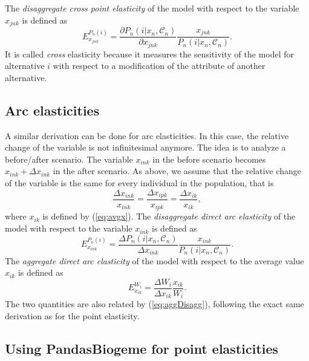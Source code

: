 \documentclass[12pt,a4paper]{article}
\newcommand{\req}[1]{(\ref{#1})}
\newcommand{\C}{\mathcal{C}}
\begin{document}
The \emph{disaggregate cross point elasticity} of the model with respect to
the variable $x_{jnk}$ is defined as
\begin{equation}
\label{eq:disagCrossElasticity}
  E_{x_{jnk}}^{P_n(i)} = \frac{\partial P_n(i|x_n, \C_n)}{\partial
  x_{jnk}} \frac{x_{jnk}}{P_n(i|x_n, \C_n)}.
\end{equation}
It is called \emph{cross} elasticity because it measures the sensitivity
of the model for alternative $i$ with respect to a  modification of
the attribute of another alternative.



\subsection{Arc elasticities}

A similar derivation can be done for arc elasticities. In this case,
the relative change of the variable is not infinitesimal anymore. The
idea is to analyze a before/after scenario. The variable $x_{ink}$ in
the before scenario becomes $x_{ink} + \Delta x_{ink}$ in the after scenario.
As above,  we assume that the relative change of
the variable is the same for every individual in the population,  that
is
\begin{equation}
  \label{eq:uniformChangeArc}
\frac{\Delta x_{ink}}{x_{ink}} = \frac{\Delta x_{ipk}}{x_{ipk}} =
\frac{\Delta x_{ik}}{x_{ik}},
\end{equation}
where $x_{ik}$ is defined by \req{eq:avgx}.
The \emph{disaggregate direct arc elasticity} of the model with respect to
the variable $x_{ink}$ is defined as
\begin{equation}
\label{eq:disagElasticityArc}
  E_{x_{ink}}^{P_n(i)} = \frac{\Delta P_n(i|x_n, \C_n)}{\Delta
  x_{ink}} \frac{x_{ink}}{P_n(i|x_n, \C_n)}.
\end{equation}
The \emph{aggregate direct arc elasticity} of the model with
respect to the average value $x_{ik}$ is defined as
\begin{equation}
E_{x_{ik}}^{W_i} = \frac{\Delta W_i}{\Delta x_{ik}} \frac{x_{ik}}{W_i}.
\end{equation}
The two quantities are also related by \req{eq:aggDisagg},  following
the exact same derivation as for the point elasticity.

\subsection{Using PandasBiogeme for point elasticities}
\end{document}
